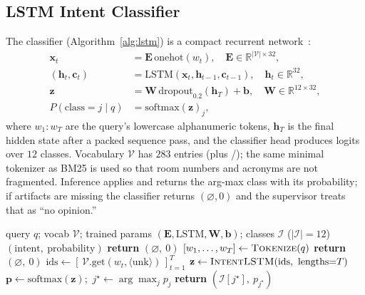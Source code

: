 \subsection{LSTM Intent Classifier}
The classifier (Algorithm~\ref{alg:lstm}) is a compact recurrent
network~\cite{hochreiter1997lstm}:
\begin{align}
\mathbf{x}_t &= \mathbf{E}\,\text{onehot}(w_t), \quad \mathbf{E}\in\mathbb{R}^{|\mathcal{V}|\times 32},\\
(\mathbf{h}_t,\mathbf{c}_t) &= \mathrm{LSTM}(\mathbf{x}_t, \mathbf{h}_{t-1}, \mathbf{c}_{t-1}), \quad \mathbf{h}_t\in\mathbb{R}^{32},\\
\mathbf{z} &= \mathbf{W}\,\mathrm{dropout}_{0.2}(\mathbf{h}_{T}) + \mathbf{b}, \quad \mathbf{W}\in\mathbb{R}^{12\times 32},\\
P(\text{class} = j \mid q) &= \mathrm{softmax}(\mathbf{z})_j,
\end{align}
where $w_1{:}w_T$ are the query's lowercase alphanumeric tokens,
$\mathbf{h}_T$ is the final hidden state after a packed sequence pass, and
the classifier head produces logits over $12$ classes. Vocabulary
$\mathcal{V}$ has $283$ entries (plus /); the same
minimal tokenizer as BM25 is used so that room numbers and acronyms are not
fragmented. Inference applies  and returns the arg-max class
with its probability; if artifacts are missing the classifier returns
$(\varnothing, 0)$ and the supervisor treats that as ``no opinion.''

\begin{algorithm}[!t]
\caption{LSTM Intent Classification Pipeline}
\label{alg:lstm}
\begin{algorithmic}[1]
\Require query $q$; vocab $\mathcal{V}$; trained params $(\mathbf{E},\text{LSTM},\mathbf{W},\mathbf{b})$; classes $\mathcal{I}$ ($|\mathcal{I}|{=}12$)
\Ensure $(\text{intent},\ \text{probability})$
 \textbf{return} $(\varnothing,\ 0)$ \EndIf
\State $[w_1,\dots,w_T] \gets \textsc{Tokenize}(q)$ \Comment{\code{[a-z0-9]+}}
 \textbf{return} $(\varnothing,\ 0)$ \EndIf
\State $\text{ids} \gets [\,\mathcal{V}.\text{get}(w_t, \langle\text{unk}\rangle)\,]_{t=1}^{T}$
\State $\mathbf{z} \gets \textsc{IntentLSTM}(\text{ids},\ \text{lengths}{=}T)$ 
\State $\mathbf{p} \gets \mathrm{softmax}(\mathbf{z})$;\ $j^\star \gets \arg\max_j p_j$
\State \textbf{return} $(\mathcal{I}[j^\star],\ p_{j^\star})$
\end{algorithmic}
\end{algorithm}


